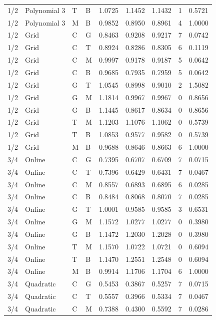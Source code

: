 \begin{longtable}{llllrrrrr}
1/2 & Polynomial 3 & T & B & 1.0725 & 1.1452 & 1.1432 & 1 & 0.5721 \\
1/2 & Polynomial 3 & M & B & 0.9852 & 0.8950 & 0.8961 & 4 & 1.0000 \\
1/2 & Grid & C & G & 0.8463 & 0.9208 & 0.9217 & 7 & 0.0742 \\
1/2 & Grid & C & T & 0.8924 & 0.8286 & 0.8305 & 6 & 0.1119 \\
1/2 & Grid & C & M & 0.9997 & 0.9178 & 0.9187 & 5 & 0.0642 \\
1/2 & Grid & C & B & 0.9685 & 0.7935 & 0.7959 & 5 & 0.0642 \\
1/2 & Grid & G & T & 1.0545 & 0.8998 & 0.9010 & 2 & 1.5082 \\
1/2 & Grid & G & M & 1.1814 & 0.9967 & 0.9967 & 0 & 0.8656 \\
1/2 & Grid & G & B & 1.1445 & 0.8617 & 0.8634 & 0 & 0.8656 \\
1/2 & Grid & T & M & 1.1203 & 1.1076 & 1.1062 & 0 & 0.5739 \\
1/2 & Grid & T & B & 1.0853 & 0.9577 & 0.9582 & 0 & 0.5739 \\
1/2 & Grid & M & B & 0.9688 & 0.8646 & 0.8663 & 6 & 1.0000 \\
3/4 & Online & C & G & 0.7395 & 0.6707 & 0.6709 & 7 & 0.0715 \\
3/4 & Online & C & T & 0.7396 & 0.6429 & 0.6431 & 7 & 0.0467 \\
3/4 & Online & C & M & 0.8557 & 0.6893 & 0.6895 & 6 & 0.0285 \\
3/4 & Online & C & B & 0.8484 & 0.8068 & 0.8070 & 7 & 0.0285 \\
3/4 & Online & G & T & 1.0001 & 0.9585 & 0.9585 & 3 & 0.6531 \\
3/4 & Online & G & M & 1.1572 & 1.0277 & 1.0277 & 0 & 0.3980 \\
3/4 & Online & G & B & 1.1472 & 1.2030 & 1.2028 & 0 & 0.3980 \\
3/4 & Online & T & M & 1.1570 & 1.0722 & 1.0721 & 0 & 0.6094 \\
3/4 & Online & T & B & 1.1470 & 1.2551 & 1.2548 & 0 & 0.6094 \\
3/4 & Online & M & B & 0.9914 & 1.1706 & 1.1704 & 6 & 1.0000 \\
3/4 & Quadratic & C & G & 0.5453 & 0.3867 & 0.5257 & 7 & 0.0715 \\
3/4 & Quadratic & C & T & 0.5557 & 0.3966 & 0.5334 & 7 & 0.0467 \\
3/4 & Quadratic & C & M & 0.7388 & 0.4300 & 0.5592 & 7 & 0.0286 \\

\end{longtable}
